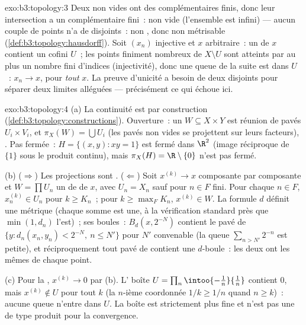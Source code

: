 \begin{solution}{exo:b3:topology:3}
Deux  non vides ont des complémentaires finis, donc
leur intersection a un complémentaire fini~: non vide
(l'ensemble est infini) --- aucun couple de points n'a de
 disjoints~: non , donc non métrisable
(\cref{def:b3:topology:hausdorff}). Soit $(x_n)$ injective et
$x$ arbitraire~: un  de $x$ contient un 
cofini $U$~; les points finiment nombreux de $X\setminus U$
sont atteints par au plus un nombre fini d'indices
(injectivité), donc une queue de la suite est dans $U$~:
$x_n \to x$, pour \emph{tout} $x$. La preuve d'unicité a
besoin de deux  disjoints pour séparer deux
limites alléguées --- précisément ce qui échoue ici.
\end{solution}

\begin{solution}{exo:b3:topology:4}
(a) La continuité est par construction
(\cref{def:b3:topology:constructions}). Ouverture~: un 
$W \subseteq X \times Y$ est réunion de pavés $U_i\times
V_i$, et $\pi_X(W) = \bigcup U_i$ (les pavés non vides se
projettent sur leurs facteurs), . Pas fermée~: $H =
\{(x,y) : xy = 1\}$ est fermé dans $\R^2$ (image réciproque de
$\{1\}$ sous le produit continu), mais $\pi_X(H) =
\R\setminus\{0\}$ n'est pas fermé.

(b) ($\Rightarrow$) Les projections sont .
($\Leftarrow$) Soit $x^{(k)} \to x$ composante par composante
et $W = \prod U_n$ un  de  de $x$, avec $U_n =
X_n$ sauf pour $n \in F$ fini. Pour chaque $n \in F$,
$x_n^{(k)} \in U_n$ pour $k \geq K_n$~; pour $k \geq \max_F
K_n$, $x^{(k)} \in W$. La formule $d$ définit une métrique
(chaque somme est une, à la vérification standard près que
$\min(1, d_n)$ l'est)~; ses boules~: $B_d(x, 2^{-N})$ contient
le pavé de  $\{y : d_n(x_n,y_n) < 2^{-N},\ n \leq N'\}$
pour $N'$ convenable (la queue $\sum_{n > N'} 2^{-n}$ est
petite), et réciproquement tout pavé de  contient une
$d$-boule~: les deux  ont les mêmes  de
chaque point.

(c) Pour la , $x^{(k)} \to 0$ par (b).
L' boîte $U = \prod_n \intoo{-\tfrac1n}{\tfrac1n}$
contient $0$, mais $x^{(k)} \notin U$ pour tout $k$ (la
$n$-ième coordonnée $1/k \geq 1/n$ quand $n \geq k$)~: aucune
queue n'entre dans $U$. La  boîte est strictement
plus fine et n'est pas une  de type produit pour la
convergence.
\end{solution}

